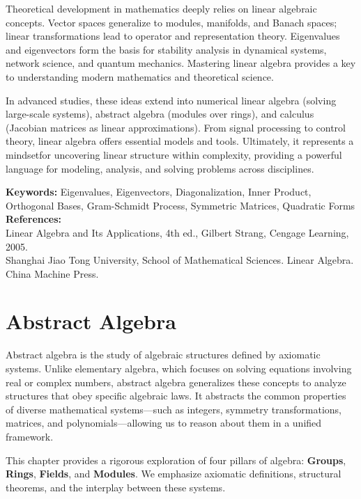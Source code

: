 \documentclass[oneside]{book}
\begin{document}
Theoretical development in mathematics deeply relies on linear algebraic concepts. Vector spaces generalize to modules, manifolds, and Banach spaces; linear transformations lead to operator and representation theory. Eigenvalues and eigenvectors form the basis for stability analysis in dynamical systems, network science, and quantum mechanics. Mastering linear algebra provides a key to understanding modern mathematics and theoretical science.

In advanced studies, these ideas extend into numerical linear algebra (solving large-scale systems), abstract algebra (modules over rings), and calculus (Jacobian matrices as linear approximations). From signal processing to control theory, linear algebra offers essential models and tools. Ultimately, it represents a mindsetfor uncovering linear structure within complexity, providing a powerful language for modeling, analysis, and solving problems across disciplines.


\vspace{1cm}
\noindent
\textbf{Keywords:} Eigenvalues, Eigenvectors, Diagonalization, Inner Product, Orthogonal Bases, Gram-Schmidt Process, Symmetric Matrices, Quadratic Forms \\
\textbf{References:} \\
Linear Algebra and Its Applications, 4th ed., Gilbert Strang, Cengage Learning, 2005. \\
Shanghai Jiao Tong University, School of Mathematical Sciences. Linear Algebra. China Machine Press.


\chapter{Abstract Algebra}

Abstract algebra is the study of algebraic structures defined by axiomatic systems. Unlike elementary algebra, which focuses on solving equations involving real or complex numbers, abstract algebra generalizes these concepts to analyze structures that obey specific algebraic laws. It abstracts the common properties of diverse mathematical systems—such as integers, symmetry transformations, matrices, and polynomials—allowing us to reason about them in a unified framework. 

This chapter provides a rigorous exploration of four pillars of algebra: \textbf{Groups}, \textbf{Rings}, \textbf{Fields}, and \textbf{Modules}. We emphasize axiomatic definitions, structural theorems, and the interplay between these systems.
\end{document}
